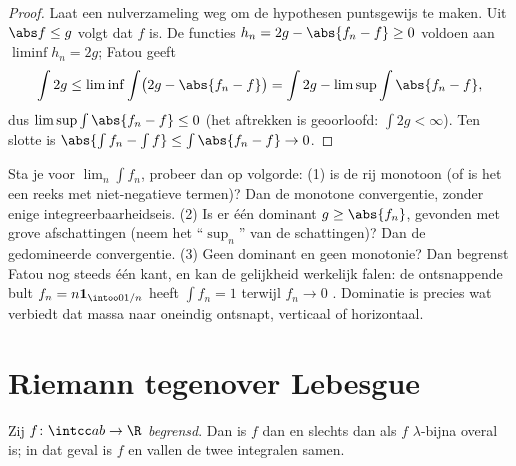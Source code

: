 \begin{proof}
Laat een nulverzameling weg om de hypothesen puntsgewijs te maken.
Uit $\abs f \leq g$ volgt dat $f$  is. De functies
$h_n = 2g - \abs{f_n - f} \geq 0$ voldoen aan $\liminf h_n = 2g$;
Fatou geeft
\[
\int 2g \leq \liminf\int\bigl(2g - \abs{f_n - f}\bigr)
= \int 2g - \limsup\int\abs{f_n - f},
\]
dus $\limsup\int\abs{f_n - f} \leq 0$ (het aftrekken is geoorloofd:
$\int 2g < \infty$). Ten slotte is $\abs{\int f_n - \int f} \leq
\int\abs{f_n - f} \to 0$.
\end{proof}

\begin{method}\label{met:b3:lebesgue:convergence}
Sta je voor $\lim_n\int f_n$, probeer dan op volgorde: (1) is de
rij monotoon (of is het een reeks met niet-negatieve termen)? Dan
de monotone convergentie, zonder enige integreerbaarheidseis. (2)
Is er één  dominant $g \geq \abs{f_n}$, gevonden met
grove afschattingen (neem het ``$\sup_n$'' van de schattingen)?
Dan de gedomineerde convergentie. (3) Geen dominant en geen
monotonie? Dan begrenst Fatou nog steeds één kant, en kan de
gelijkheid werkelijk falen: de ontsnappende bult $f_n = n\mathbf
1_{\intoo0{1/n}}$ heeft $\int f_n = 1$ terwijl $f_n \to 0$ . Dominatie is precies wat verbiedt dat massa naar oneindig
ontsnapt, verticaal of horizontaal.
\end{method}

\section{Riemann tegenover Lebesgue}

\begin{theorem}
\label{thm:b3:lebesgue:riemann}
Zij $f \colon \intcc ab \to \R$ \emph{begrensd}. Dan is $f$
 dan en slechts dan als $f$
$\lambda$-bijna overal  is; in dat geval is $f$
 en vallen de twee integralen
samen.
\end{theorem}

